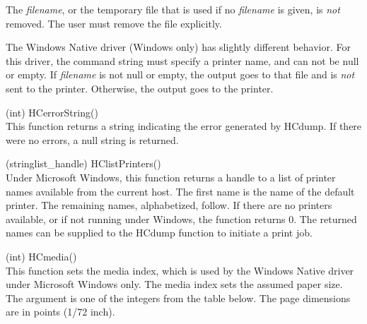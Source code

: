 \begin{description}
The {\it filename}, or the temporary file that is used if no {\it
filename} is given, is {\it not} removed.  The user must remove the
file explicitly.

The Windows Native driver (Windows only) has slightly different
behavior.  For this driver, the command string must specify a printer
name, and can not be null or empty.  If {\it filename} is not null or
empty, the output goes to that file and is {\it not} sent to the
printer.  Otherwise, the output goes to the printer.

\item{(int) \vt HCerrorString()}\\
This function returns a string indicating the error generated by {\vt
HCdump}.  If there were no errors, a null string is returned.

\item{(stringlist\_handle) \vt HClistPrinters()}\\
Under Microsoft Windows, this function returns a handle to a list of
printer names available from the current host.  The first name is the
name of the default printer.  The remaining names, alphabetized,
follow.  If there are no printers available, or if not running under
Windows, the function returns 0.  The returned names can be supplied
to the {\vt HCdump} function to initiate a print job.

\item{(int) \vt HCmedia()}\\
This function sets the media index, which is used by the Windows
Native driver under Microsoft Windows only.  The media index sets the
assumed paper size.  The argument is one of the integers from the
table below.  The page dimensions are in points (1/72 inch).
    

\end{description}
